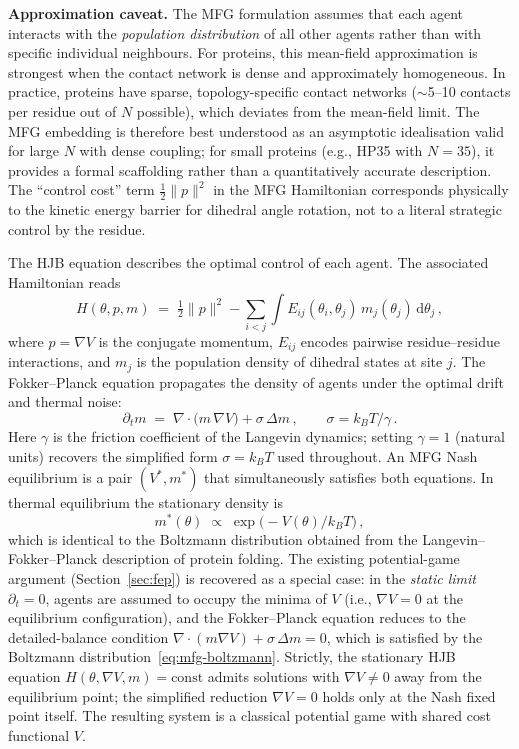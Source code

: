 \documentclass[12pt,a4paper]{article}
\theoremstyle{remark}
\begin{document}
\textbf{Approximation caveat.} The MFG formulation assumes that each agent interacts with the \emph{population distribution} of all other agents rather than with specific individual neighbours. For proteins, this mean-field approximation is strongest when the contact network is dense and approximately homogeneous. In practice, proteins have sparse, topology-specific contact networks ($\sim$5--10 contacts per residue out of $N$ possible), which deviates from the mean-field limit. The MFG embedding is therefore best understood as an asymptotic idealisation valid for large $N$ with dense coupling; for small proteins (e.g., HP35 with $N=35$), it provides a formal scaffolding rather than a quantitatively accurate description. The ``control cost'' term $\frac{1}{2}\|p\|^2$ in the MFG Hamiltonian corresponds physically to the kinetic energy barrier for dihedral angle rotation, not to a literal strategic control by the residue.

The HJB equation describes the optimal control of each agent. The associated Hamiltonian reads
\begin{equation}\label{eq:mfg-hamiltonian}
  H(\theta,p,m) \;=\; \tfrac{1}{2}\|p\|^{2}
    - \sum_{i<j}\int E_{ij}(\theta_i,\theta_j)\,m_j(\theta_j)\,\mathrm{d}\theta_j\,,
\end{equation}
where $p=\nabla V$ is the conjugate momentum, $E_{ij}$ encodes pairwise residue--residue interactions, and $m_j$ is the population density of dihedral states at site $j$. The Fokker--Planck equation propagates the density of agents under the optimal drift and thermal noise:
\begin{equation}\label{eq:mfg-fp}
  \partial_t m \;=\; \nabla\!\cdot\!\bigl(m\,\nabla V\bigr) + \sigma\,\Delta m\,,
  \qquad \sigma = k_B T / \gamma\,.
\end{equation}
Here $\gamma$ is the friction coefficient of the Langevin dynamics; setting $\gamma = 1$ (natural units) recovers the simplified form $\sigma = k_B T$ used throughout.
An MFG Nash equilibrium is a pair $(V^{*},m^{*})$ that simultaneously satisfies both equations. In thermal equilibrium the stationary density is
\begin{equation}\label{eq:mfg-boltzmann}
  m^{*}(\theta) \;\propto\; \exp\!\bigl(-V(\theta)/k_B T\bigr)\,,
\end{equation}
which is identical to the Boltzmann distribution obtained from the Langevin--Fokker--Planck description of protein folding. The existing potential-game argument (Section~\ref{sec:fep}) is recovered as a special case: in the \emph{static limit} $\partial_t=0$, agents are assumed to occupy the minima of $V$ (i.e., $\nabla V=0$ at the equilibrium configuration), and the Fokker--Planck equation reduces to the detailed-balance condition $\nabla\!\cdot(m\nabla V)+ \sigma\,\Delta m=0$, which is satisfied by the Boltzmann distribution~\eqref{eq:mfg-boltzmann}. Strictly, the stationary HJB equation $H(\theta,\nabla V,m)=\text{const}$ admits solutions with $\nabla V\neq 0$ away from the equilibrium point; the simplified reduction $\nabla V=0$ holds only at the Nash fixed point itself. The resulting system is a classical potential game with shared cost functional $V$.
\end{document}
